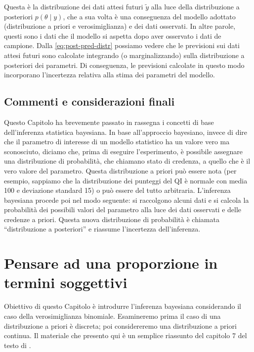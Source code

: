\documentclass[
  11pt,
]{krantz}
\theoremstyle{definition}
\theoremstyle{definition}
\theoremstyle{definition}
\theoremstyle{definition}
\theoremstyle{remark}
\begin{document}
Questa è la distribuzione dei dati attesi futuri \(\tilde{y}\) alla luce della distribuzione a posteriori \(p(\theta \mid y)\), che a sua volta è una conseguenza del modello adottato (distribuzione a priori e verosimiglianza) e dei dati osservati. In altre parole, questi sono i dati che il modello si aspetta dopo aver osservato i dati de campione. Dalla \eqref{eq:post-pred-distr} possiamo vedere che le previsioni sui dati attesi futuri sono calcolate integrando (o marginalizzando) sulla distribuzione a posteriori dei parametri. Di conseguenza, le previsioni calcolate in questo modo incorporano l'incertezza relativa alla stima dei parametri del modello.

\hypertarget{commenti-e-considerazioni-finali}{%
\section*{Commenti e considerazioni finali}\label{commenti-e-considerazioni-finali}}


Questo Capitolo ha brevemente passato in rassegna i concetti di base dell'inferenza statistica bayesiana. In base all'approccio bayesiano, invece di dire che il parametro di interesse di un modello statistico ha un valore vero ma sconosciuto, diciamo che, prima di eseguire l'esperimento, è possibile assegnare una distribuzione di probabilità, che chiamano stato di credenza, a quello che è il vero valore del parametro. Questa distribuzione a priori può essere nota (per esempio, sappiamo che la distribuzione dei punteggi del QI è normale con media 100 e deviazione standard 15) o può essere del tutto arbitraria. L'inferenza bayesiana procede poi nel modo seguente: si raccolgono alcuni dati e si calcola la probabilità dei possibili valori del parametro alla luce dei dati osservati e delle credenze a priori. Questa nuova distribuzione di probabilità è chiamata ``distribuzione a posteriori'' e riassume l'incertezza dell'inferenza.

\hypertarget{ch-subj-think-prop}{%
\chapter{Pensare ad una proporzione in termini soggettivi}\label{ch-subj-think-prop}}

Obiettivo di questo Capitolo è introdurre l'inferenza bayesiana considerando il caso della verosimiglianza binomiale. Esamineremo prima il caso di una distribuzione a priori è discreta; poi considereremo una distribuzione a priori continua. Il materiale che presento qui è un semplice riassunto del capitolo 7 del testo di \citet{albert2019probability}.
\end{document}
